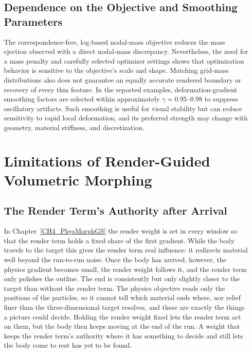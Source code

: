 \subsection{Dependence on the Objective and Smoothing Parameters}
The correspondence-free, log-based nodal-mass objective reduces the mass ejection observed with a direct nodal-mass discrepancy. Nevertheless, the need for a mass penalty and carefully selected optimizer settings shows that optimization behavior is sensitive to the objective's scale and shape. Matching grid-mass distributions also does not guarantee an equally accurate rendered boundary or recovery of every thin feature. In the reported examples, deformation-gradient smoothing factors are selected within approximately $\gamma=0.95$--$0.98$ to suppress oscillatory artifacts. Such smoothing is useful for visual stability but can reduce sensitivity to rapid local deformation, and its preferred strength may change with geometry, material stiffness, and discretization.

\section{Limitations of Render-Guided Volumetric Morphing}
\label{subsec:lim-bridge}

\subsection{The Render Term's Authority after Arrival}
In Chapter~\ref{CH4_PhysMorphGS} the render weight is set in every window so that the render term holds a fixed share of the first gradient. While the body travels to the target this gives the render term real influence: it redirects material well beyond the run-to-run noise. Once the body has arrived, however, the physics gradient becomes small, the render weight follows it, and the render term only polishes the outline. The end is consistently but only slightly closer to the target than without the render term. The physics objective reads only the positions of the particles, so it cannot tell which material ends where, nor relief finer than the three-dimensional target resolves, and these are exactly the things a picture could decide. Holding the render weight fixed lets the render term act on them, but the body then keeps moving at the end of the run. A weight that keeps the render term's authority where it has something to decide and still lets the body come to rest has yet to be found.

